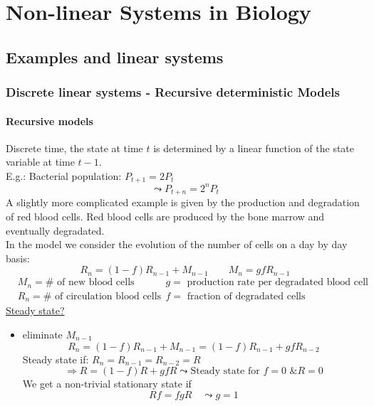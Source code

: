 \section{Non-linear Systems in Biology}
\subsection{Examples and linear systems}
\subsubsection{Discrete linear systems - Recursive deterministic Models}
\paragraph{Recursive models} Discrete time, the state at time $t$ is determined by a linear function of the state variable at time $t-1$.\\
E.g.: Bacterial population: $P_{t+1}=2P_t$
\begin{equation*}
\leadsto P_{t+n}=2^nP_t
\end{equation*}
A slightly more complicated example is given by the production and degradation of red blood cells. Red blood cells are produced by the bone marrow and eventually degradated.\\
In the model we consider the evolution of the number of cells on a day by day basis:
\begin{equation*}
R_n=(1-f)R_{n-1}+M_{n-1} \qquad M_n=gfR_{n-1}
\end{equation*}
\begin{align*}
	&M_n=\# \text{ of new blood cells} &g=\text{ production rate per degradated blood cell}\\
	&R_n=\# \text{ of circulation blood cells} &f=\text{ fraction of degradated cells}
\end{align*}
\underline{Steady state?}
\begin{itemize}[label={$\to$}]
	\item eliminate $M_{n-1}$
		\begin{equation*}
			R_n=(1-f)R_{n-1}+M_{n-1}=(1-f)R_{n-1}+gfR_{n-2}
		\end{equation*}
		Steady state if: $R_n=R_{n-1}=R_{n-2}=R$
		\begin{equation*}
			\Rightarrow R=(1-f)R +gfR \leadsto \text{Steady state for $f=0$ \& $R=0$}
		\end{equation*}
		We get a non-trivial stationary state if
		\begin{equation*}
			Rf=fgR \quad \leadsto g=1
		\end{equation*}
\end{itemize}
